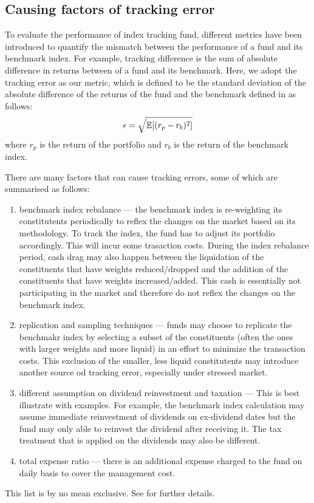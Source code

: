 \subsection{Causing factors of tracking error}
To evaluate the performance of index tracking fund, different metrics have been introduced to quantify the mismatch between the performance of a fund and its benchmark index. For example, tracking difference is the sum of absolute difference in returns between of a fund and its benchmark. Here, we adopt the tracking error as our metric, which is defined to be the standard deviation of the absolute difference of the returns of the fund and the benchmark defined in \cite{BJ13} as follows:
\begin{equation}
  \epsilon = \sqrt{\operatorname{\mathbb{E}}[(r_p - r_b)^2]}
\end{equation}
where $r_p$ is the return of the portfolio and $r_b$ is the return of the benchmark index.
 
There are many factors that can cause tracking errors, some of which are summarised as follows:
\begin{enumerate}
\item benchmark index rebalance --- the benchmark index is re-weighting its constitutents periodically to reflex the changes on the market based on its methodology. To track the index, the fund has to adjust its portfolio accordingly. This will incur some trasaction costs. During the index rebalance period, cash drag may also  happen between the liquidation of the constituents that have weights reduced/dropped and the addition of the constituents that have weights increased/added. This cash is essentially not participating in the market and therefore do not reflex the changes on the benchmark index.
\item replication and sampling techniques --- funds may choose to replicate the benchmakr index by selecting a subset of the constituents (often the ones with larger weights and more liquid) in an effort to minimize the transaction costs. This exclusion of the smaller, less liquid constitutents may introduce another source od tracking error, especially under stressed market.
\item different assumption on dividend reinvestment and taxation --- This is best illustrate with examples. For example, the benchmark index calculation may assume immediate reinvestment of dividends on ex-dividend dates but the fund may only able to reinvest the dividend after receiving it. The tax treatment that is applied on the dividends may also be different.
\item total expense ratio --- there is an additional expense charged to the fund on daily basis to cover the management cost.
\end{enumerate}
This list is by no mean exclusive. See \cite{BJ13} for further details.
 
